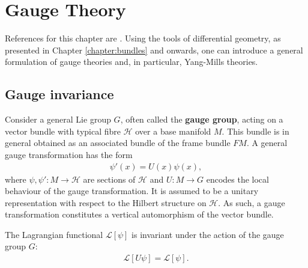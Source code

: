 \chapter{Gauge Theory}\label{chapter:gauge_theory}

    References for this chapter are \cite{principal_bundles, sen_nash, schuller, gauge1}. Using the tools of differential geometry, as presented in Chapter \ref{chapter:bundles} and onwards, one can introduce a general formulation of gauge theories and, in particular, Yang-Mills theories.

\section{Gauge invariance}

    Consider a general Lie group $G$, often called the \textbf{gauge group}, acting on a vector bundle with typical fibre $\mathcal{H}$ over a base manifold $M$. This bundle is in general obtained as an associated bundle of the frame bundle $FM$. A general gauge transformation has the form
    \begin{gather}
        \label{gauge:gauge_transformation}
        \psi'(x) = U(x)\psi(x),
    \end{gather}
    where $\psi,\psi':M\rightarrow\mathcal{H}$ are sections of $\mathcal{H}$ and $U:M\rightarrow G$ encodes the local behaviour of the gauge transformation. It is assumed to be a unitary representation with respect to the Hilbert structure on $\mathcal{H}$. As such, a gauge transformation constitutes a vertical automorphism of the vector bundle.

    \begin{axiom}
        The Lagrangian functional $\mathcal{L}[\psi]$ is invariant under the action of the gauge group $G$:
        \begin{gather}
            \mathcal{L}[U\psi] = \mathcal{L}[\psi].
        \end{gather}
    \end{axiom}


